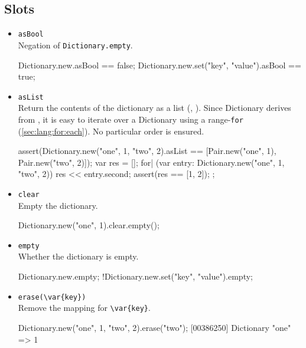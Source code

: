 \subsection{Slots}

\begin{itemize}
\item \lstinline|asBool|\\
  Negation of \lstinline|Dictionary.empty|.
\begin{urbiassert}
Dictionary.new.asBool == false;
Dictionary.new.set("key", "value").asBool == true;
\end{urbiassert}

\item \lstinline|asList|\\
  Return the contents of the dictionary as a  list
  (, ).  Since Dictionary derives from
  , it is easy to iterate over a Dictionary
  using a range-\lstinline|for| (\autoref{sec:lang:for:each}).  No
  particular order is ensured.

\begin{urbiscript}
assert(Dictionary.new("one", 1, "two", 2).asList
       == [Pair.new("one", 1), Pair.new("two", 2)]);
{
  var res = [];
  for| (var entry: Dictionary.new("one", 1, "two", 2))
    res << entry.second;
  assert(res == [1, 2]);
};
\end{urbiscript}

\item \lstinline|clear|\\
  Empty the dictionary.

\begin{urbiassert}
Dictionary.new("one", 1).clear.empty();
\end{urbiassert}

\item \lstinline|empty|\\
  Whether the dictionary is empty.

\begin{urbiassert}
Dictionary.new.empty;
!Dictionary.new.set("key", "value").empty;
\end{urbiassert}

\item \lstinline|erase(\var{key})|\\
  Remove the mapping for \lstinline|\var{key}|.

\begin{urbiscript}
Dictionary.new("one", 1, "two", 2).erase("two");
[00386250] Dictionary {"one" => 1}
\end{urbiscript}


\end{itemize}
